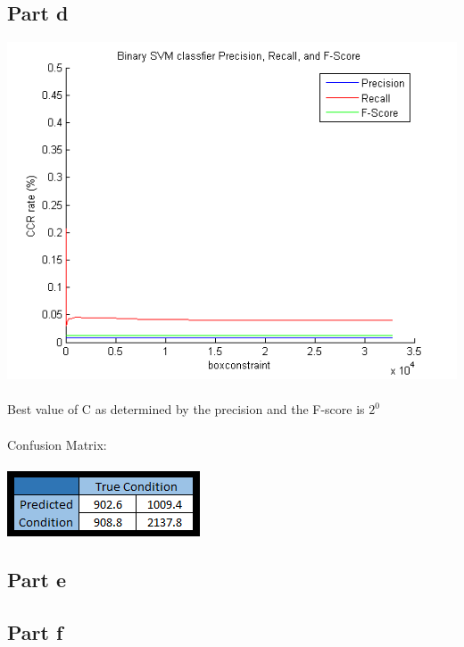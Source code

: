 \documentclass[paper=a4, fontsize=11pt]{scrartcl} %
\numberwithin{equation}{section} %
\numberwithin{figure}{section} %
\numberwithin{table}{section} %
\begin{document}
	\subsection{Part d}
	\includegraphics[scale=0.8]{part_d_CV_CCR}
	\\\\
	Best value of C as determined by the precision and the F-score is $2^0$
	\\\\
	Confusion Matrix:
	\\\\
	\includegraphics{part_d_confusion_matrix}
	
	
	\subsection{Part e}
	
	\subsection{Part f}
	
\end{document}

